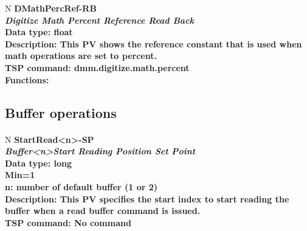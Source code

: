 \documentclass[openany]{article}
\begin{document}
		\begin{tabular}{N}
			\hline
			\bfseries DMathPercRef-RB\label{pv:dmathpercref-rb} \\ \hline
			\emph{Digitize Math Percent Reference Read Back} \\
			Data type: float \\
			Description: This PV shows the reference constant that is used when math operations are set to percent. \\
			TSP command: dmm.digitize.math.percent \\
			Functions: \\
			\arrayrulecolor{\FuncTableBorderColor}

		\end{tabular}

	\subsection{Buffer operations}\label{pvgroup:buffer-operations}

		\paragraph{} %

		\begin{tabular}{N}
			\hline
			\bfseries StartRead\textless n\textgreater-SP\label{pv:startread-sp} \\ \hline
			\emph{Buffer\textless n\textgreater Start Reading Position Set Point} \\
			Data type: long \\
			Min=1 \\
			n: number of default buffer (1 or 2) \\
			Description: This PV specifies the start index to start reading the buffer when a read buffer command is issued. \\
			TSP command: No command
		\end{tabular}
\end{document}
